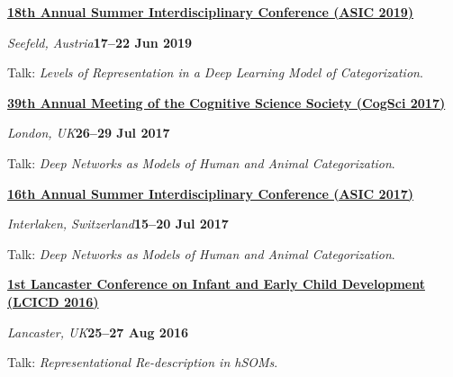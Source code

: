 \documentclass[10pt]{article}
\newenvironment{outerlist}[1][\enskip\textbullet]%
        {\begin{itemize}[#1]}{\end{itemize}%
         \vspace{-.6\baselineskip}}
\newenvironment{innerlist}[1][\enskip\textbullet]%
        {\begin{compactitem}[#1]}{\end{compactitem}}
\begin{document}
\textbf{\href{http://www.cogs.indiana.edu/asic/2019/index.shtml}{18th Annual Summer Interdisciplinary Conference (ASIC 2019)}}
\begin{outerlist}
  \item[] \textit{Seefeld, Austria}\hfill\textbf{17--22 Jun 2019}
  \begin{innerlist}
    \item Talk: \textit{Levels of Representation in a Deep Learning Model of Categorization}.
  \end{innerlist}
\end{outerlist}
\vspace{8pt}

\begin{samepage}

\textbf{\href{http://www.cognitivesciencesociety.org/conference/cogsci2017/}{ 39th Annual Meeting of the Cognitive Science Society (CogSci 2017)}}
\begin{outerlist}
  \item[] \textit{London, UK}\hfill\textbf{26--29 Jul 2017}
  \begin{innerlist}
    \item Talk: \textit{Deep Networks as Models of Human and Animal Categorization}.
  \end{innerlist}
\end{outerlist}
\vspace{8pt}\end{samepage}


\textbf{\href{http://www.cogs.indiana.edu/asic/2017/index.shtml}{16th Annual Summer Interdisciplinary Conference (ASIC 2017)}}
\begin{outerlist}
  \item[] \textit{Interlaken, Switzerland}\hfill\textbf{15--20 Jul 2017}
  \begin{innerlist}
    \item Talk: \textit{Deep Networks as Models of Human and Animal Categorization}.
  \end{innerlist}
\end{outerlist}

\vspace{8pt}

\textbf{\href{http://wp.lancs.ac.uk/lcicd/past-events/}{1st Lancaster Conference on Infant and Early Child Development (LCICD 2016)}}
\begin{outerlist}
  \item[] \textit{Lancaster, UK}\hfill\textbf{25--27 Aug 2016}
  \begin{innerlist}
    \item Talk: \textit{Representational Re-description in hSOMs}.
  \end{innerlist}
\end{outerlist}
\vspace{8pt}
\end{document}
